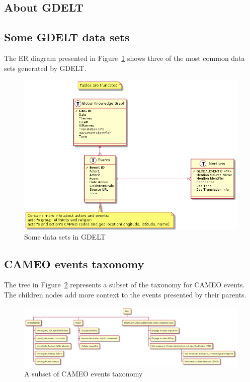 \documentclass[a4, 11pt]{article}
\begin{document}
\newpage

\begin{appendices}

\section{About GDELT}

\subsection{Some GDELT data sets}

The ER diagram presented in Figure~\ref{fig:gdelt_datasets} shows three of the
most common data sets generated by GDELT.

\begin{figure}[ht] 
    \centering
    \includegraphics[width=\textwidth]{Images/gdelt_datasets.png}%
    \caption{Some data sets in GDELT} 
    \label{fig:gdelt_datasets}
\end{figure}

\subsection{CAMEO events taxonomy}

The tree in Figure~\ref{fig:cameo_taxonomy} represents a subset of the taxonomy
for CAMEO events. The children nodes add more context to the events presented by
their parents.

\begin{figure}[ht]
    \centering
    \includegraphics[scale=0.3]{Images/CAMEO_taxonomy.png}%
    \caption{A subset of CAMEO events taxonomy} 
    \label{fig:cameo_taxonomy}
\end{figure}


\end{appendices}
\end{document}
